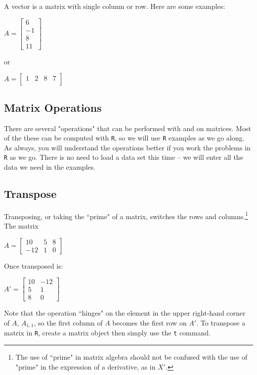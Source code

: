 \documentclass[11pt,openany]{book}\usepackage[]{graphicx}\usepackage[]{color}
\begin{document}
A vector is a matrix with single column or row. Here are some examples:  

$A = 
\begin{bmatrix}
6 \\
-1 \\
8 \\
11
\end{bmatrix}$

\noindent or 

$A =
\begin{bmatrix}
  1 & 2 & 8 & 7 \\
\end{bmatrix}$  
  
\subsection{Matrix Operations}

There are several "operations" that can be performed with and on matrices. Most of the these can be computed with \texttt{R}, so we will use \texttt{R} examples as we go along. As always, you will understand the operations better if you work the problems in \texttt{R} as we go. There is no need to load a data set this time -- we will enter all the data we need in the examples.
  
\subsection{Transpose}

Transposing, or taking the ``prime" of a matrix, switches the rows and columns.\footnote{The use of ``prime" in matrix algebra should not be confused
with the use of "prime" in the expression of a derivative, as in $X'$.} The matrix
\noindent


$A = 
\begin{bmatrix}
  10 & 5 & 8 \\
  -12 & 1 & 0
\end{bmatrix}$

\noindent

Once transposed is: 

$A' =
\begin{bmatrix}
  10 & -12 \\
  5 & 1 \\
  8 & 0
\end{bmatrix}$

\noindent 
Note that the operation ``hinges" on the element in the upper right-hand corner of $A$, $A_{1,1}$, so the first column of $A$ becomes the first row on $A'$. To transpose a matrix in \texttt{R}, create a matrix object then simply use the \texttt{t} command. 
\end{document}

